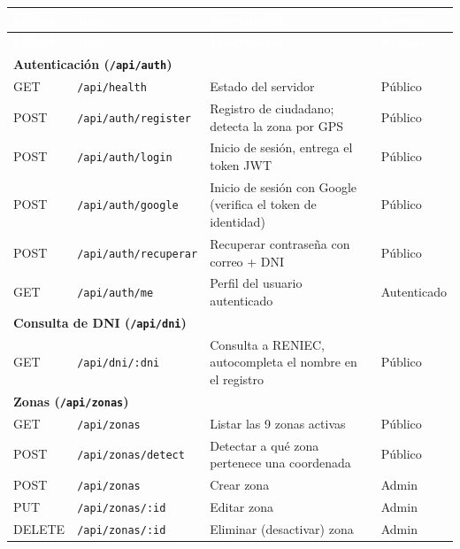 \documentclass[11pt,a4paper]{article}
\begin{document}
\begin{longtable}{|p{1.6cm}|p{4.6cm}|p{6cm}|p{1.8cm}|}
\hline
\rowcolor{azuloscuro}
\textcolor{white}{\textbf{Método}} & \textcolor{white}{\textbf{Ruta}} & \textcolor{white}{\textbf{Descripción}} & \textcolor{white}{\textbf{Acceso}} \\
\hline
\endfirsthead
\hline
\rowcolor{azuloscuro}
\textcolor{white}{\textbf{Método}} & \textcolor{white}{\textbf{Ruta}} & \textcolor{white}{\textbf{Descripción}} & \textcolor{white}{\textbf{Acceso}} \\
\hline
\endhead

\multicolumn{4}{|l|}{\cellcolor{grisclaro}\textbf{Autenticación (\texttt{/api/auth})}} \\
\hline
GET & \texttt{/api/health} & Estado del servidor & Público \\
\hline
POST & \texttt{/api/auth/register} & Registro de ciudadano; detecta la zona por GPS & Público \\
\hline
POST & \texttt{/api/auth/login} & Inicio de sesión, entrega el token JWT & Público \\
\hline
POST & \texttt{/api/auth/google} & Inicio de sesión con Google (verifica el token de identidad) & Público \\
\hline
POST & \texttt{/api/auth/recuperar} & Recuperar contraseña con correo + DNI & Público \\
\hline
GET & \texttt{/api/auth/me} & Perfil del usuario autenticado & Autenticado \\
\hline

\multicolumn{4}{|l|}{\cellcolor{grisclaro}\textbf{Consulta de DNI (\texttt{/api/dni})}} \\
\hline
GET & \texttt{/api/dni/:dni} & Consulta a RENIEC, autocompleta el nombre en el registro & Público \\
\hline

\multicolumn{4}{|l|}{\cellcolor{grisclaro}\textbf{Zonas (\texttt{/api/zonas})}} \\
\hline
GET & \texttt{/api/zonas} & Listar las 9 zonas activas & Público \\
\hline
POST & \texttt{/api/zonas/detect} & Detectar a qué zona pertenece una coordenada & Público \\
\hline
POST & \texttt{/api/zonas} & Crear zona & Admin \\
\hline
PUT & \texttt{/api/zonas/:id} & Editar zona & Admin \\
\hline
DELETE & \texttt{/api/zonas/:id} & Eliminar (desactivar) zona & Admin \\
\hline


\end{longtable}
\end{document}
